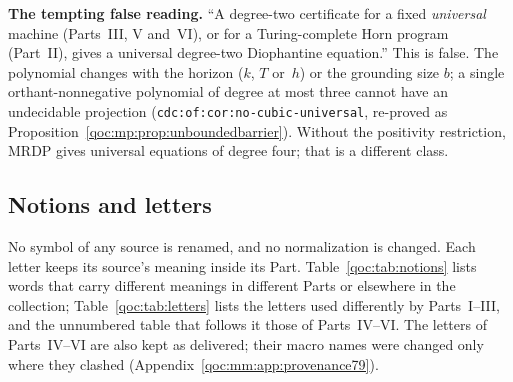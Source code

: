 \documentclass[11pt,letterpaper]{article}
\theoremstyle{definition}
\theoremstyle{remark}
\newcommand{\lab}[1]{\nolinkurl{#1}}
\begin{document}
\textbf{The tempting false reading.} ``A degree-two certificate for a fixed \emph{universal} machine (Parts~III, V and~VI), or for a Turing-complete Horn program (Part~II), gives a universal degree-two Diophantine equation.'' This is false. The polynomial changes with the horizon ($k$, $T$ or~$h$) or the grounding size $b$; a single orthant-nonnegative polynomial of degree at most three cannot have an undecidable projection (\lab{cdc:of:cor:no-cubic-universal}, re-proved as Proposition~\ref{qoc:mp:prop:unboundedbarrier}). Without the positivity restriction, MRDP gives universal equations of degree four; that is a different class.

\subsection{Notions and letters}\label{qoc:sec:conventions}

No symbol of any source is renamed, and no normalization is changed. Each letter keeps its source's meaning inside its Part. Table~\ref{qoc:tab:notions} lists words that carry different meanings in different Parts or elsewhere in the collection; Table~\ref{qoc:tab:letters} lists the letters used differently by Parts~I--III, and the unnumbered table that follows it those of Parts~IV--VI. The letters of Parts~IV--VI are also kept as delivered; their macro names were changed only where they clashed (Appendix~\ref{qoc:mm:app:provenance79}).
\end{document}
